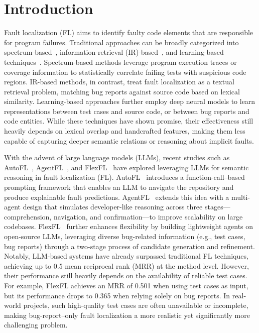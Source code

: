 \section{Introduction}

Fault localization (FL) aims to identify faulty code elements that are responsible for program failures.
Traditional approaches can be broadly categorized into spectrum-based~\cite{sp1,sp2,sp3}, information-retrieval (IR)-based~\cite{yu2008empirical,jones2005empirical,chilimbi2009holmes,santelices2009lightweight}, and learning-based techniques~\cite{dl1,dl2}.
Spectrum-based methods leverage program execution traces or coverage information to statistically correlate failing tests with suspicious code regions.
IR-based methods, in contrast, treat fault localization as a textual retrieval problem, matching bug reports against source code based on lexical similarity.
Learning-based approaches further employ deep neural models to learn representations between test cases and source code, or between bug reports and code entities.
While these techniques have shown promise, their effectiveness still heavily depends on lexical overlap and handcrafted features,
making them less capable of capturing deeper semantic relations or reasoning about implicit faults.

With the advent of large language models (LLMs), recent studies such as AutoFL~\cite{autofl}, AgentFL~\cite{agentfl}, and FlexFL~\cite{flexfl} have explored leveraging LLMs for semantic reasoning in fault localization (FL). 
AutoFL~\cite{autofl} introduces a function-call–based prompting framework that enables an LLM to navigate the repository and produce explainable fault predictions. 
AgentFL~\cite{agentfl} extends this idea with a multi-agent design that simulates developer-like reasoning across three stages—comprehension, navigation, and confirmation—to improve scalability on large codebases. 
FlexFL~\cite{flexfl} further enhances flexibility by building lightweight agents on open-source LLMs, leveraging diverse bug-related information (e.g., test cases, bug reports) through a two-stage process of candidate generation and refinement.
Notably, LLM-based systems have already surpassed traditional FL techniques, achieving up to 0.5 mean reciprocal rank (MRR) at the method level. 
However, their performance still heavily depends on the availability of reliable test cases. 
For example, FlexFL achieves an MRR of 0.501 when using test cases as input, but its performance drops to 0.365 when relying solely on bug reports. 
In real-world projects, such high-quality test cases are often unavailable or incomplete, making bug-report–only fault localization a more realistic yet significantly more challenging problem.

